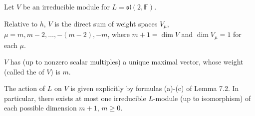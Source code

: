 Let $V$ be an irreducible module for $L = \mathfrak{sl}(2, \mathbb{F})$.

 Relative to $h$, $V$ is the direct sum of weight spaces $V_\mu$, $\mu = m, m-2, \ldots, -(m-2), -m$, where $m+1 = \dim V$ and $\dim V_\mu = 1$ for each $\mu$.

 $V$ has (up to nonzero scalar multiples) a unique maximal vector, whose weight (called the  of $V$) is $m$.

 The action of $L$ on $V$ is given explicitly by formulas (a)-(c) of Lemma 7.2. In particular, there exists at most one irreducible $L$-module (up to isomorphism) of each possible dimension $m+1$, $m \geq 0$.
